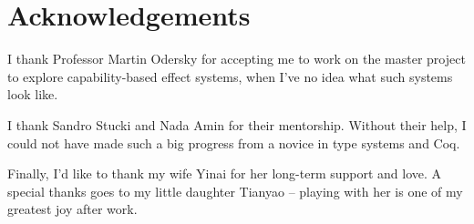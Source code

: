 \section*{\centering Acknowledgements}

I thank Professor Martin Odersky for accepting me to work on the
master project to explore capability-based effect systems, when I've
no idea what such systems look like.

I thank Sandro Stucki and Nada Amin for their mentorship. Without
their help, I could not have made such a big progress from a novice in
type systems and Coq.

Finally, I'd like to thank my wife Yinai for her long-term support and
love. A special thanks goes to my little daughter Tianyao -- playing
with her is one of my greatest joy after work.

